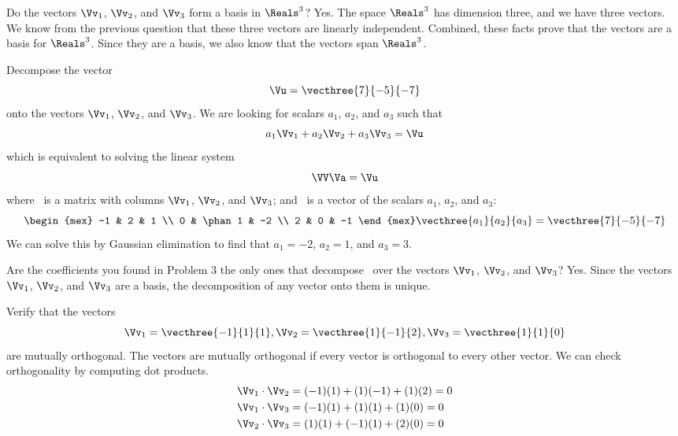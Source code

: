 \documentclass[12pt,ragged]{pajarticle}
\begin{document}
\begin{question}{2}{%
Do the vectors $\Vv_1$, $\Vv_2$, and $\Vv_3$ form a basis in $\Reals^3$?
}{
Yes. The space $\Reals^3$ has dimension three, and we have three vectors. We know from the previous question that these three vectors are linearly independent. Combined, these facts prove that the vectors are a basis for $\Reals^3$. Since they are a basis, we also know that the vectors span $\Reals^3$.
}
\end{question}


\begin{question}{3}{%
Decompose the vector 
\[ \Vu = \vecthree{7}{-5}{-7} \]
onto the vectors $\Vv_1$, $\Vv_2$, and $\Vv_3$.}{
We are looking for scalars $a_1$, $a_2$, and $a_3$ such that
\[ a_1\Vv_1 + a_2\Vv_2 + a_3\Vv_3 = \Vu \]
which is equivalent to solving the linear system
\[ \VV\Va = \Vu \]
where \VV\ is a matrix with columns $\Vv_1$, $\Vv_2$, and $\Vv_3$; and \Va\ is a vector of the scalars $a_1$, $a_2$, and $a_3$:
\[ \begin{mex} -1 & 2 & 1 \\ 0 & \phan1 & -2 \\ 2 & 0 & -1 \end{mex} \vecthree{a_1}{a_2}{a_3} = \vecthree{7}{-5}{-7} \]
We can solve this by Gaussian elimination to find that $a_1=-2$, $a_2=1$, and $a_3=3$.
}	
\end{question}

\begin{question}{4}{%
Are the coefficients you found in Problem 3 the only ones that decompose \Vu\ over the vectors $\Vv_1$, $\Vv_2$, and $\Vv_3$?
}{
Yes. Since the vectors $\Vv_1$, $\Vv_2$, and $\Vv_3$ are a basis, the decomposition of any vector onto them is unique.
}
\end{question}

\begin{question}{5}{%
Verify that the vectors
\[ \Vv_1 = \vecthree{-1}{1}{1}, \Vv_2 = \vecthree{1}{-1}{2}, \Vv_3 = \vecthree{1}{1}{0} \]
are mutually orthogonal.}{%
The vectors are mutually orthogonal if every vector is orthogonal to every other vector. We can check orthogonality by computing dot products.
\begin{align*}
	\Vv_1\cdot\Vv_2 &= (-1)(1) + (1)(-1) + (1)(2) = 0 \\
	\Vv_1\cdot\Vv_3 &= (-1)(1) + (1)(1) + (1)(0) = 0 \\
	\Vv_2\cdot\Vv_3 &= (1)(1) + (-1)(1) + (2)(0) = 0	
\end{align*}
}
\end{question}
\end{document}

